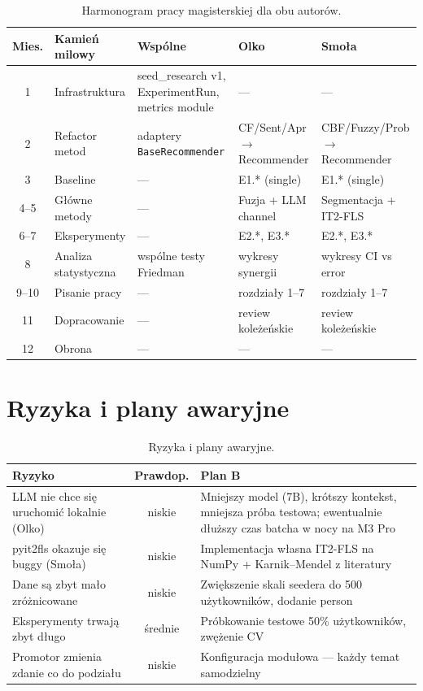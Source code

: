 \documentclass[a4paper,11pt]{article}
\newcommand{\code}[1]{\texttt{\small #1}}
\begin{document}
\begin{table}[H]
\centering
\footnotesize
\begin{tabularx}{\textwidth}{c Y Y Y Y}
\toprule
\textbf{Mies.} & \textbf{Kamień milowy} & \textbf{Wspólne} & \textbf{Olko} & \textbf{Smoła} \\
 & Infrastruktura & seed\_research v1, ExperimentRun, metrics module & --- & --- \\
2 & Refactor metod & adaptery \code{BaseRecommender} & CF/Sent/Apr $\to$ Recommender & CBF/Fuzzy/Prob $\to$ Recommender \\
3 & Baseline & --- & E1.* (single) & E1.* (single) \\
4--5 & Główne metody & --- & Fuzja + LLM channel & Segmentacja + IT2-FLS \\
6--7 & Eksperymenty & --- & E2.*, E3.* & E2.*, E3.* \\
8 & Analiza statystyczna & wspólne testy Friedman & wykresy synergii & wykresy CI vs error \\
9--10 & Pisanie pracy & --- & rozdziały 1--7 & rozdziały 1--7 \\
11 & Dopracowanie & --- & review koleżeńskie & review koleżeńskie \\
12 & Obrona & --- & --- & --- \\
\bottomrule
\end{tabularx}
\caption{Harmonogram pracy magisterskiej dla obu autorów.}
\end{table}

\section{Ryzyka i plany awaryjne}

\begin{table}[H]
\centering
\small
\begin{tabularx}{\textwidth}{Y c Y}
\toprule
\textbf{Ryzyko} & \textbf{Prawdop.} & \textbf{Plan B} \\
\midrule
LLM nie chce się uruchomić lokalnie (Olko) & niskie & Mniejszy model (7B), krótszy kontekst, mniejsza próba testowa; ewentualnie dłuższy czas batcha w nocy na M3 Pro \\
pyit2fls okazuje się buggy (Smoła) & niskie & Implementacja własna IT2-FLS na NumPy + Karnik--Mendel z literatury \\
Dane są zbyt mało zróżnicowane & niskie & Zwiększenie skali seedera do 500 użytkowników, dodanie person \\
Eksperymenty trwają zbyt długo & średnie & Próbkowanie testowe 50\% użytkowników, zwężenie CV \\
Promotor zmienia zdanie co do podziału & niskie & Konfiguracja modułowa --- każdy temat samodzielny \\
\bottomrule
\end{tabularx}
\caption{Ryzyka i plany awaryjne.}
\end{table}
\end{document}
